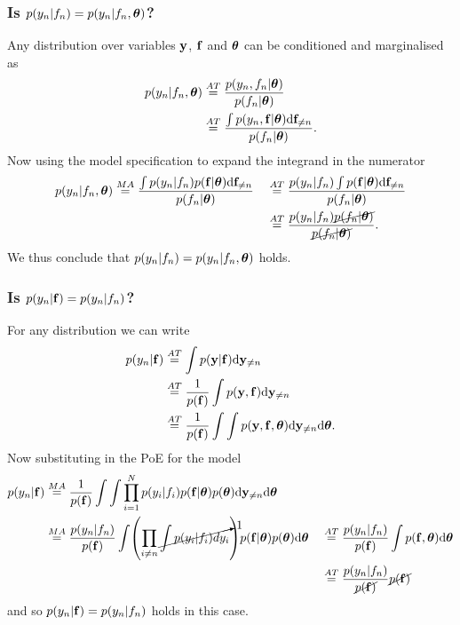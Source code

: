 \documentclass[a4paper]{article}
\theoremstyle{definition}
\begin{document}
\subsubsection{Is $p(y_n | f_n ) = p( y_n | f_n, \boldsymbol{\theta} )$?}
Any distribution over variables $\mathbf{y}$, $\mathbf{f}$ and $\boldsymbol{\theta}$ can be conditioned and marginalised as
\begin{align}
p( y_n | f_n, \boldsymbol{\theta} ) &\stackrel{AT}{=} \frac{ p( y_n, f_n | \boldsymbol{\theta} ) }{ p( f_n | \boldsymbol{\theta}) } \\
&\stackrel{AT}{=} \frac{ \int p( y_n, \mathbf{f} | \boldsymbol{\theta} ) \mathrm{d} \mathbf{f}_{\neq n}}{ p( f_n | \boldsymbol{\theta}) }.
\end{align}
Now using the model specification to expand the integrand in the numerator
\begin{alignat}{2}
p( y_n | f_n, \boldsymbol{\theta} )  &\stackrel{MA}{=} \frac{ \int p( y_n | f_n) p( \mathbf{f} | \boldsymbol{\theta} ) \mathrm{d} \mathbf{f}_{\neq n}}{ p( f_n | \boldsymbol{\theta} ) } &&\stackrel{AT}{=}  \frac{ p( y_n | f_n) \int p( \mathbf{f} | \boldsymbol{\theta} ) \mathrm{d} \mathbf{f}_{\neq n}}{ p( f_n | \boldsymbol{\theta} ) }\\
& &&\stackrel{AT}{=}  \frac{ p( y_n | f_n) \cancel{ p( f_n | \boldsymbol{\theta} ) } }{ \cancel{ p( f_n | \boldsymbol{\theta} ) } }.
\end{alignat}
We thus conclude that $p(y_n | f_n ) = p( y_n | f_n, \boldsymbol{\theta} )$ holds.

\subsubsection{Is $p(y_n | \mathbf{f} ) = p( y_n | f_n )$?}
For any distribution we can write
\begin{align}
p( y_n | \mathbf{f} ) &\stackrel{AT}{=} \int p(\mathbf{y} | \mathbf{f} ) \mathrm{d} \mathbf{y}_{\neq n} \\
&\stackrel{AT}{=} \frac{ 1 }{ p( \mathbf{f} ) } \int p( \mathbf{y}, \mathbf{f} )  \mathrm{d} \mathbf{y}_{\neq n} \\
&\stackrel{AT}{=} \frac{ 1 }{ p( \mathbf{f} ) } \int\int p( \mathbf{y}, \mathbf{f}, \boldsymbol{\theta} )  \mathrm{d} \mathbf{y}_{\neq n} \mathrm{d}\boldsymbol{\theta}.
\end{align}
Now substituting in the PoE for the model
\begin{alignat}{2}
p( y_n | \vf ) &\stackrel{MA}{=} \frac{ 1 }{ p( \vf ) } \int\int \prod_{i=1}^N p(y_i | f_i) p(\vf | \vtheta) p(\vtheta)  \calcd \vy_{\neq n} \calcd\vtheta &&\\
&\stackrel{MA}{=} \frac{ p( y_n | f_n ) }{ p( \vf ) } \int \left( \prod_{i \neq n} \cancelto{ 1 }{ \int p(y_i | f_i) dy_i} \right) p(\vf | \vtheta) p(\vtheta) \calcd\vtheta &&\stackrel{AT}{=} \frac{ p( y_n | f_n ) }{ p( \vf ) } \int p(\vf, \vtheta) \calcd\vtheta \\
& &&\stackrel{AT}{=} \frac{ p( y_n | f_n ) }{ \cancel{ p( \vf ) } } \cancel{ p( \vf ) }
\end{alignat}
and so $p(y_n | \mathbf{f} ) = p( y_n | f_n )$ holds in this case.
\end{document}
